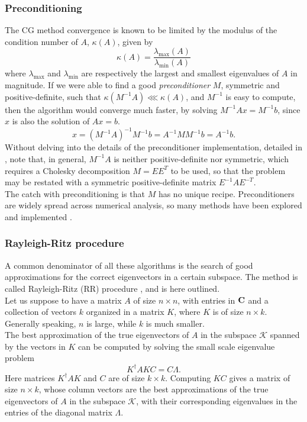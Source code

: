\subsubsection{Preconditioning}
\label{sec:preconditioning}
The CG method convergence is known to be limited by the modulus of the condition number of $A$, $\kappa(A)$, given by \cite{PainlessCGM}
\begin{equation}
    \label{eq:cond_num}
    \kappa(A) = \frac{\lambda_\text{max}(A)}{\lambda_\text{min}(A)}
\end{equation}
where $\lambda_\text{max}$ and $\lambda_\text{min}$ are respectively the largest and smallest eigenvalues of $A$ in magnitude.
If we were able to find a good \textit{preconditioner} $M$, symmetric and positive-definite, such that $\kappa(M^{-1}A) \lll \kappa(A)$, and $M^{-1}$ is easy to compute, then the algorithm would converge much faster, by solving $M^{-1}Ax = M^{-1}b$, since $x$ is also the solution of $Ax = b$.
\begin{equation}
    \label{eq:precond}
    x = (M^{-1}A)^{-1} M^{-1}b = A^{-1} MM^{-1} b = A^{-1} b.
\end{equation}
Without delving into the details of the preconditioner implementation, detailed in \cite{PainlessCGM}, note that, in general, $M^{-1}A$ is neither positive-definite nor symmetric, which requires a Cholesky decomposition \cite{cholesky} $M = EE^T$ to be used, so that the problem may be restated with a symmetric positive-definite matrix $E^{-1}AE^{-T}$.
\\The catch with preconditioning is that $M$ has no unique recipe. Preconditioners are widely spread across numerical analysis, so many methods have been explored and implemented \cite{pearson2020preconditioners}.
\subsubsection{Rayleigh-Ritz procedure}
\label{sec:rayleigh_ritz}
A common denominator of all these algorithms is the search of good approximations for the correct eigenvectors in a certain subspace. The method is called Rayleigh-Ritz (RR) procedure \cite{Saad1992}, and is here outlined.
\\Let us suppose to have a matrix $A$ of size $n\times n$, with entries in $\mathbf{C}$ and a collection of vectors $k$ organized in a matrix $K$, where $K$ is of size $n\times k$. Generally speaking, $n$ is large, while $k$ is much smaller.
\\The best approximation of the true eigenvectors of $A$ in the subspace $\mathcal K$ spanned by the vectors in $K$ can be computed by solving the small scale eigenvalue problem
\begin{equation}
    K^\dagger A  K C = C\Lambda.
\end{equation}
Here matrices $K^\dagger A K$ and $C$ are of size $k\times k$.
Computing $K C$ gives a matrix of size $n\times k$, whose column vectors are the best approximations of the true eigenvectors of $A$ in the subspace  $\mathcal K$, with their corresponding eigenvalues in the entries of the diagonal matrix $\Lambda$.
